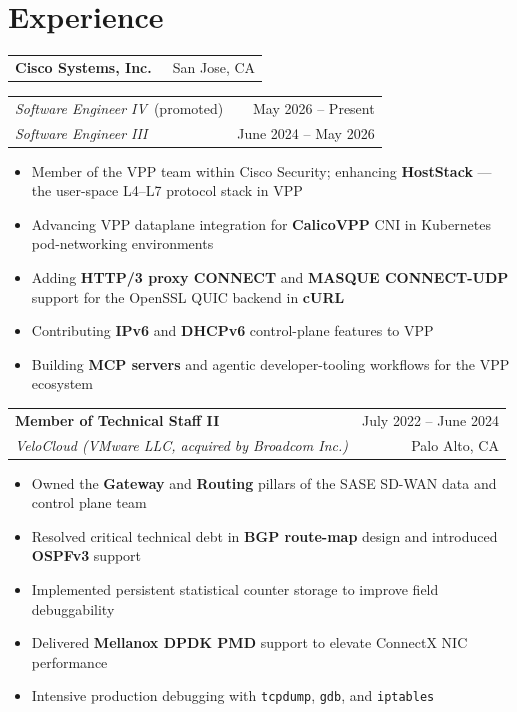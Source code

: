 \documentclass[a4paper,10pt]{article}
\makeatletter
\newcommand{\cvperiod}[1]{{\small\color{lighttext}#1}}
\newcommand{\cvloc}[1]{{\small\color{lighttext}\faMapMarkerAlt\ #1}}
\newenvironment{cventry}[4]{%
  \vspace{3pt}%
  \begin{tabularx}{\textwidth}{@{}X r@{}}
    \textbf{#1} & \cvperiod{#2} \\[-1pt]
    \textit{\color{midtext}#3} & \cvloc{#4}
  \end{tabularx}%
  \vspace{1pt}%
  \begin{itemize}[leftmargin=1.4em, itemsep=0pt, topsep=2pt, parsep=0pt, label={$\circ$}]
}{%
  \end{itemize}%
  \vspace{1pt}%
}
\newcommand{\cb}[1]{\item \small #1}
\makeatother
\begin{document}
\section{Experience}

\vspace{3pt}
\begin{tabularx}{\textwidth}{@{}X r@{}}
  \textbf{Cisco Systems, Inc.} & \cvloc{San Jose, CA}
\end{tabularx}
\vspace{2pt}
\begin{tabularx}{\textwidth}{@{}X r@{}}
  \quad\textit{\color{midtext}Software Engineer IV}~{\small\color{accent}(promoted)} & \cvperiod{May 2026 – Present} \\[-1pt]
  \quad\textit{\color{midtext}Software Engineer III} & \cvperiod{June 2024 – May 2026}
\end{tabularx}
\vspace{1pt}
\begin{itemize}[leftmargin=2.2em, itemsep=0pt, topsep=2pt, parsep=0pt, label={$\circ$}]
  \cb{Member of the VPP team within Cisco Security; enhancing \textbf{HostStack} — the user-space L4–L7 protocol stack in VPP}
  \cb{Advancing VPP dataplane integration for \textbf{CalicoVPP} CNI in Kubernetes pod-networking environments}
  \cb{Adding \textbf{HTTP/3 proxy CONNECT} and \textbf{MASQUE CONNECT-UDP} support for the OpenSSL QUIC backend in \textbf{cURL}}
  \cb{Contributing \textbf{IPv6} and \textbf{DHCPv6} control-plane features to VPP}
  \cb{Building \textbf{MCP servers} and agentic developer-tooling workflows for the VPP ecosystem}
\end{itemize}
\vspace{2pt}

\begin{cventry}{Member of Technical Staff II}{July 2022 – June 2024}{VeloCloud (VMware LLC, acquired by Broadcom Inc.)}{Palo Alto, CA}
  \cb{Owned the \textbf{Gateway} and \textbf{Routing} pillars of the SASE SD-WAN data and control plane team}
  \cb{Resolved critical technical debt in \textbf{BGP route-map} design and introduced \textbf{OSPFv3} support}
  \cb{Implemented persistent statistical counter storage to improve field debuggability}
  \cb{Delivered \textbf{Mellanox DPDK PMD} support to elevate ConnectX NIC performance}
  \cb{Intensive production debugging with \texttt{tcpdump}, \texttt{gdb}, and \texttt{iptables}}
\end{cventry}
\end{document}
